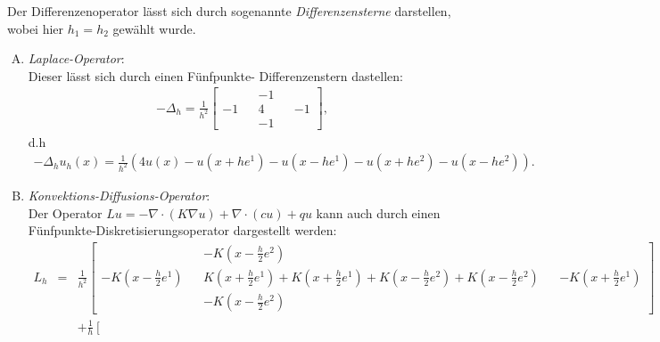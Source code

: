 \begin{Beispiel}[$d = 2$]
    Der Differenzenoperator lässt sich durch sogenannte
    \emph{Differenzensterne} darstellen, wobei hier $h_1 = h_2$ gewählt wurde.
    \begin{enumerate}[A)]
	\item
	    \emph{Laplace-Operator}: \\
	    Dieser lässt sich durch einen Fünfpunkte-
	    Differenzenstern dastellen:
	    \begin{eqnarray*}
              -\Delta_h
            = \frac{1}{h^2}
              \begin{bmatrix}
                  & & -1 & & \\
                  -1 & & 4 & & -1 \\
                  & & -1 & &
              \end{bmatrix},
	    \end{eqnarray*}
	    d.h
	    \begin{eqnarray*}
              -\Delta_h u_h(x)
            = \frac{1}{h^2} \left(4 u(x) - u\left(x + h e^1\right)
              - u\left(x - h e^1\right) - u\left(x + h e^2\right)
              - u\left(x - h e^2\right)\right).
	    \end{eqnarray*}
	\item
	    \emph{Konvektions-Diffusions-Operator}: \\
	    Der Operator
        $L u = -\nabla \cdot (K \nabla u) + \nabla \cdot (c u) + q u$
        kann auch durch einen Fünfpunkte-Diskretisierungsoperator
        dargestellt werden:
	    \begin{eqnarray*}
                L_h
            &=& \frac{1}{h^2} \left[
                \begin{smallmatrix}
                    & & -K\left(x - \frac{h}{2} e^2\right) & & \\
                    -K\left(x - \frac{h}{2} e^1\right) & &
                    K\left(x + \frac{h}{2} e^1\right)
                    + K\left(x + \frac{h}{2} e^1\right)
                    + K\left(x - \frac{h}{2} e^2\right)
                    + K\left(x - \frac{h}{2} e^2\right) & &
                    -K\left(x + \frac{h}{2} e^1\right) \\
                    & & -K\left(x - \frac{h}{2} e^2\right) & &
                \end{smallmatrix} \right] \\
		    &&+ \frac{1}{h} \left[
                \begin{smallmatrix}

\end{smallmatrix}
\end{eqnarray*}
\end{enumerate}
\end{Beispiel}
